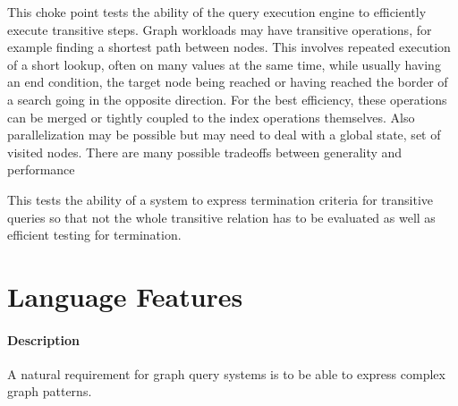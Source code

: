

This choke point tests the ability of the query execution engine to efficiently execute transitive steps. Graph workloads may have transitive operations, for example finding a shortest path between nodes.
This involves repeated execution of a short lookup, often on many values at the
same time, while usually having an end condition, \eg the target node being reached or having reached the border of a search going in the opposite direction.
For the best efficiency, these operations can be merged or tightly coupled to
the index operations themselves. Also parallelization may be possible but may
need to deal with a global state, \eg set of visited nodes.
There are many possible tradeoffs between generality and performance





This tests the ability of a system to express termination criteria for transitive queries so that not the whole transitive relation has to be evaluated as well as efficient testing for termination.




\section{Language Features}




\paragraph{Description}

A natural requirement for graph query systems is to be able to express complex
graph patterns.

